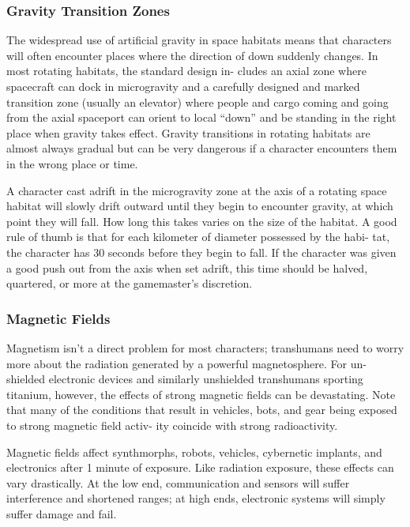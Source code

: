 \subsubsection{Gravity Transition Zones}


The widespread use of artificial gravity in space 
habitats means that characters will often encounter 
places where the direction of down suddenly changes. 
In most rotating habitats, the standard design in-
cludes an axial zone where spacecraft can dock in 
microgravity and a carefully designed and marked 
transition zone (usually an elevator) where people and 
cargo coming and going from the axial spaceport can 
orient to local ``down'' and be standing in the right 
place when gravity takes effect. Gravity transitions in 
rotating habitats are almost always gradual but can 
be very dangerous if a character encounters them in 
the wrong place or time.

A character cast adrift in the microgravity zone at 
the axis of a rotating space habitat will slowly drift 
outward until they begin to encounter gravity, at 
which point they will fall. How long this takes varies 
on the size of the habitat. A good rule of thumb is that 
for each kilometer of diameter possessed by the habi-
tat, the character has 30 seconds before they begin to 
fall. If the character was given a good push out from 
the axis when set adrift, this time should be halved, 
quartered, or more at the gamemaster's discretion.

\subsubsection{Magnetic Fields}

Magnetism isn't a direct problem for most characters; 
transhumans need to worry more about the radiation 
generated by a powerful magnetosphere. For un-
shielded electronic devices and similarly unshielded 
transhumans sporting titanium, however, the effects 
of strong magnetic fields can be devastating. Note that 
many of the conditions that result in vehicles, bots, 
and gear being exposed to strong magnetic field activ-
ity coincide with strong radioactivity.

Magnetic fields affect synthmorphs, robots, vehicles, 
cybernetic implants, and electronics after 1 minute of 
exposure. Like radiation exposure, these effects can 
vary drastically. At the low end, communication and 
sensors will suffer interference and shortened ranges; 
at high ends, electronic systems will simply suffer 
damage and fail.

